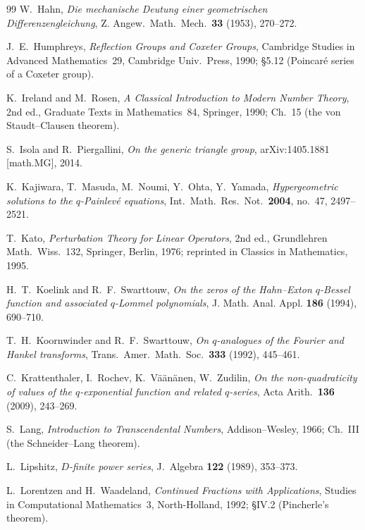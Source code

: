 \documentclass[11pt]{article}
\theoremstyle{plain}
\theoremstyle{definition}
\theoremstyle{remark}
\begin{document}
\begin{thebibliography}{99}
 W.~Hahn, \emph{Die mechanische Deutung einer geometrischen
Differenzengleichung}, Z. Angew.\ Math.\ Mech.\ \textbf{33} (1953), 270--272.

 J.~E.~Humphreys, \emph{Reflection Groups and Coxeter Groups}, Cambridge
Studies in Advanced Mathematics~29, Cambridge Univ.\ Press, 1990; \S5.12 (Poincar\'e series of a
Coxeter group).

 K.~Ireland and M.~Rosen, \emph{A Classical Introduction to Modern Number
Theory}, 2nd ed., Graduate Texts in Mathematics~84, Springer, 1990; Ch.~15 (the von
Staudt--Clausen theorem).

 S.~Isola and R.~Piergallini, \emph{On the generic triangle group},
arXiv:1405.1881 [math.MG], 2014.

 K.~Kajiwara, T.~Masuda, M.~Noumi, Y.~Ohta, Y.~Yamada, \emph{Hypergeometric
solutions to the $q$-Painlev\'e equations}, Int.\ Math.\ Res.\ Not.\ \textbf{2004}, no.~47,
2497--2521.

 T.~Kato, \emph{Perturbation Theory for Linear Operators}, 2nd ed., Grundlehren
Math.\ Wiss.~132, Springer, Berlin, 1976; reprinted in Classics in Mathematics, 1995.

 H.~T.~Koelink and R.~F.~Swarttouw, \emph{On the zeros of the
Hahn--Exton $q$-Bessel function and associated $q$-Lommel polynomials}, J. Math. Anal. Appl.
\textbf{186} (1994), 690--710.

 T.~H.~Koornwinder and R.~F.~Swarttouw, \emph{On $q$-analogues of the Fourier and
Hankel transforms}, Trans.\ Amer.\ Math.\ Soc.\ \textbf{333} (1992), 445--461.

 C.~Krattenthaler, I.~Rochev, K.~V\"a\"an\"anen, W.~Zudilin, \emph{On the
non-quadraticity of values of the $q$-exponential function and related $q$-series}, Acta Arith.\
\textbf{136} (2009), 243--269.

 S.~Lang, \emph{Introduction to Transcendental Numbers}, Addison--Wesley, 1966;
Ch.~III (the Schneider--Lang theorem).

 L.~Lipshitz, \emph{$D$-finite power series}, J.~Algebra \textbf{122} (1989),
353--373.

 L.~Lorentzen and H.~Waadeland, \emph{Continued Fractions with
Applications}, Studies in Computational Mathematics~3, North-Holland, 1992; \S IV.2 (Pincherle's
theorem).


\end{thebibliography}
\end{document}
